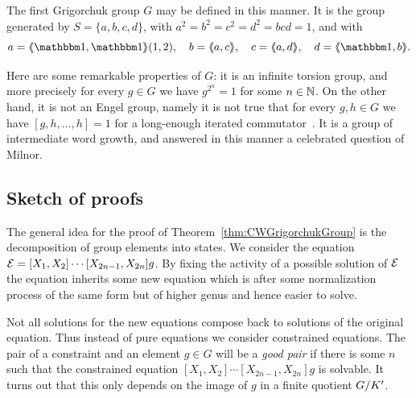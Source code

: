 \documentclass[a4paper,11pt]{amsart}
\begin{document}
The first Grigorchuk group $G$ may be defined in this manner. It is
the group generated by $S=\{a,b,c,d\}$, with $a^2=b^2=c^2=d^2=bcd=1$,
and with
\[a=\pair{\id,\id}(1,2),\quad b=\pair{a,c},\quad c=\pair{a,d},\quad d=\pair{\id,b}. \]

Here are some remarkable properties of $G$: it is an infinite torsion
group, and more precisely for every $g\in G$ we have $g^{2^n}=1$ for
some $n\in\mathbb{N}$. On the other hand, it is not an Engel group, namely it
is not true that for every $g,h\in G$ we have $[g,h,\dots,h]=1$ for a
long-enough iterated commutator~\cite{Bartholdi:Engel}. It is a group
of intermediate word growth, and answered in this manner a celebrated
question of Milnor.



\subsection{Sketch of proofs}
The general idea for the proof of Theorem~\ref{thm:CWGrigorchukGroup} is
the decomposition of group elements into states. We consider the equation
$\mathcal{E}=[X_1,X_2]\cdots[X_{2n-1},X_{2n}]g$. By fixing the activity
of a possible solution of $\mathcal{E}$ the equation inherits
some new equation which is after some normalization process of the same 
form but of higher genus and hence easier to solve.

Not all solutions for the new equations compose back to solutions 
of the original equation. Thus instead of pure equations we consider
constrained equations. The pair of a constraint and an element $g\in G$ 
will be a \emph{good pair} if there is some $n$ such that the 
constrained equation $[X_1,X_2]\cdots[X_{2n-1},X_{2n}]g$ is solvable.
It turns out that this only depends on the image of $g$ in a finite
quotient ${G/K'}$. 
\end{document}
